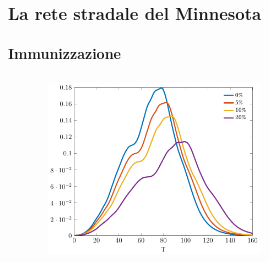 \documentclass{beamer}
\theoremstyle{definition}
\theoremstyle{plain}
\begin{document}
\begin{frame}
\frametitle{La rete stradale del Minnesota}
\framesubtitle{Immunizzazione}
   \begin{figure}[!ht]
\centering
\includegraphics[width=0.5\textwidth]{Figure/minnesota_immunizzazione}
\end{figure}
\end{frame}
\end{document}

